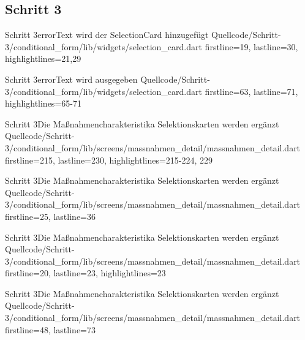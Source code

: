 \subsection{Schritt 3}

\begin{alexlisting}{Schritt 3}{errorText wird der SelectionCard hinzugefügt}
    {Quellcode/Schritt-3/conditional_form/lib/widgets/selection_card.dart}
    {firstline=19, lastline=30, highlightlines={21,29}}
    \label{lst:Schritt3DieMassnahmencharakteristikaSelektionskartenWerdenergaenzt}
\end{alexlisting}

\begin{alexlisting}{Schritt 3}{errorText wird ausgegeben}
    {Quellcode/Schritt-3/conditional_form/lib/widgets/selection_card.dart}
    {firstline=63, lastline=71, highlightlines={65-71}}
    \label{lst:Schritt3DieMassnahmencharakteristikaSelektionskartenWerdenergaenzt}
\end{alexlisting}

\begin{alexlisting}{Schritt 3}{Die Maßnahmencharakteristika Selektionskarten werden ergänzt}
    {Quellcode/Schritt-3/conditional_form/lib/screens/massnahmen_detail/massnahmen_detail.dart}
    {firstline=215, lastline=230, highlightlines={215-224, 229}}
    \label{lst:Schritt3DieMassnahmencharakteristikaSelektionskartenWerdenergaenzt}
\end{alexlisting}

\begin{alexlisting}{Schritt 3}{Die Maßnahmencharakteristika Selektionskarten werden ergänzt}
    {Quellcode/Schritt-3/conditional_form/lib/screens/massnahmen_detail/massnahmen_detail.dart}
    {firstline=25, lastline=36}
    \label{lst:Schritt3DieMassnahmencharakteristikaSelektionskartenWerdenergaenzt}
\end{alexlisting}

\begin{alexlisting}{Schritt 3}{Die Maßnahmencharakteristika Selektionskarten werden ergänzt}
    {Quellcode/Schritt-3/conditional_form/lib/screens/massnahmen_detail/massnahmen_detail.dart}
    {firstline=20, lastline=23, highlightlines={23}}
    \label{lst:Schritt3DieMassnahmencharakteristikaSelektionskartenWerdenergaenzt}
\end{alexlisting}


\begin{alexlisting}{Schritt 3}{Die Maßnahmencharakteristika Selektionskarten werden ergänzt}
    {Quellcode/Schritt-3/conditional_form/lib/screens/massnahmen_detail/massnahmen_detail.dart}
    {firstline=48, lastline=73}
    \label{lst:Schritt3DieMassnahmencharakteristikaSelektionskartenWerdenergaenzt}
\end{alexlisting}


